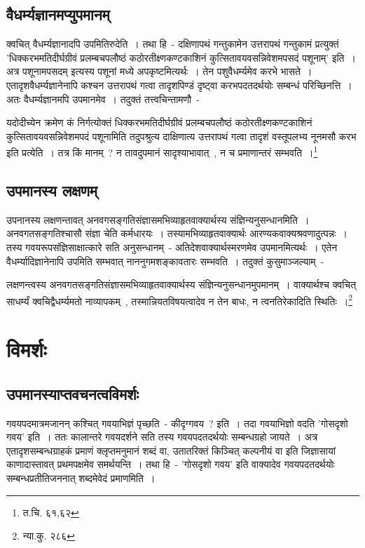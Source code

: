 		\subsection{वैधर्म्यज्ञानमप्युपमानम्}

		क्वचित् वैधर्म्यज्ञानादपि उपमितिरुदेति~। तथा हि~- दक्षिणापथं गन्तुकामेन उत्तरापथं गन्तुकामं प्रत्युक्तं 'धिक्करभमतिदीर्घग्रीवं प्रलम्बचपलौष्ठं कठोरतीक्ष्णकण्टकाशिनं कुत्सितावयवसन्निवेशमपसदं पशूनाम्' इति~। अत्र पशूनामपसदम् इत्यस्य पशूनां मध्ये अपकृष्टमित्यर्थः~। तेन पशुवैधर्म्यमेव करभे भासते~। एतादृशवैधर्म्यज्ञानेनापि कश्चन  उत्तरापथं गत्वा तादृशपिण्डं दृष्ट्वा करभपदतदर्थयोः सम्बन्धं परिच्छिनत्ति~। अतः वैधर्म्यज्ञानमपि उपमानमेव~। तदुक्तं तत्त्वचिन्तामणौ~- 

		{\fontsize{11.7}{0}\selectfont\s  यदोदीच्येन क्रमेण कं निर्गत्योक्तं धिक्करभमतिदीर्घग्रीवं प्रलम्बचपलौष्ठं कठोरतीक्ष्णकण्टकाशिनं कुत्सितावयवसन्निवेशमपदं पशूनामिति तदुपश्रुत्य दाक्षिणात्य उत्तरापथं गत्वा तादृशं वस्तूपलभ्य नूनमसौ करभ इति प्रत्येति~। तत्र किं मानम्~? न तावदुपमानं सादृश्याभावात्~, न च प्रमाणान्तरं सम्भवति~।\footnote{त.चि. ६१,६२}}

		\subsection{उपमानस्य लक्षणम्}

		उपनानस्य लक्षणन्तावत् अनवगसङ्गतिसंज्ञासमभिव्याहृतवाक्यार्थस्य संज्ञिन्यनुसन्धानमिति~। अनवगतसङ्गतिश्चासौ संज्ञा चेति कर्मधारयः~। तस्यामभिव्याहृतवाक्यार्थः आरण्यकवाक्यश्रवणादुत्पन्नः~। तस्य गवयरूपसंज्ञिसाक्षात्कारे सति अनुसन्धानम्~- अतिदेशवाक्यार्थस्मरणमेव उपमानमित्यर्थः~। एतेन वैधर्म्यादिज्ञानेनापि उपमिति सम्भवात् नाननुगमशङ्कावतारः सम्भवति~। तदुक्तं कुसुमाञ्जल्याम्~- 

		{\fontsize{11.7}{0}\selectfont\s लक्षणन्त्वस्य अनवगतसङ्गतिसंज्ञासमभिव्याहृतवाक्यार्थस्य संज्ञिन्यनुसन्धानमुपमानम्~। वाक्यार्थश्च क्वचित् साधर्म्यं क्वचिद्वैधर्म्यमतो नाव्यापकम्~, तस्मान्नियतविषयत्वादेव न तेन बाधः, न त्वनतिरेकादिति स्थितिः~।\footnote{न्या.कु. २८६}}

	\section{विमर्शः}

		\subsection{उपमानस्याप्तवचनत्वविमर्शः}

		गवयपदमात्रमजानन् कश्चित् गवयाभिज्ञं पृच्छति~- कीदृग्गवय~? इति~। तदा गवयाभिज्ञो वदति 'गोसदृशो गवय' इति~। ततः कालान्तरे गवयदर्शने सति तस्य गवयपदतदर्थयोः सम्बन्धग्रहो जायते~। अत्र एतादृशसम्बन्धग्राहकं प्रमाणं क्लृप्तमनुमानं शब्दं वा, उतातरिक्तं किञ्चित् कल्पनीयं वा इति जिज्ञासायां काणादास्तावत् प्रथमपक्षमेव समर्थयन्ति~। तथा हि~- 'गोसदृशो गवय' इति वाक्यादेव गवयपदतदर्थयोः सम्बन्धप्रतीतिजननात् शब्दमेवेदं प्रमाणमिति~। 

